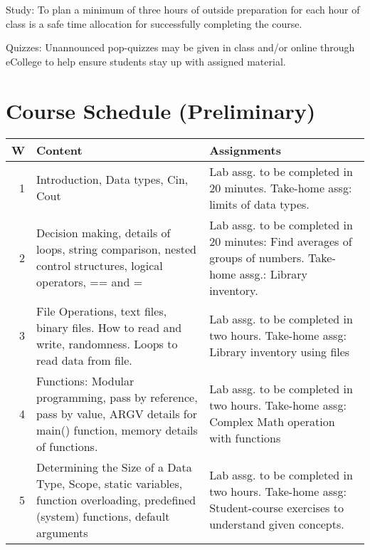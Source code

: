 \documentclass[11pt]{article}
\begin{document}
Study: To plan a minimum of three hours of outside preparation for
each hour of class is a safe time allocation for successfully
completing the course.

Quizzes: Unannounced pop-quizzes may be given in class and/or online
through eCollege to help ensure students stay up with assigned
material.
\section*{Course Schedule (Preliminary)}
\label{sec-11}


\tiny

\begin{center}
\begin{tabular}{rll}
\hline
 \textbf{W}  &  \textbf{Content}                                                                                                                      &  \textbf{Assignments}                                                                                                                                   \\
\hline
\hline
          1  &  Introduction, Data types, Cin, Cout                                                                                                   &  Lab assg. to be completed in 20 minutes. Take-home assg: limits of data types.                                                                         \\
\hline
          2  &  Decision making, details of loops, string comparison, nested control structures, logical operators, == and =                          &  Lab assg. to be completed in 20 minutes: Find averages of groups of numbers. Take-home assg.: Library inventory.                                       \\
\hline
          3  &  File Operations, text files, binary files.  How to read and write, randomness.  Loops to read data from file.                         &  Lab assg. to be completed in two hours. Take-home assg: Library inventory using files                                                                  \\
\hline
          4  &  Functions: Modular programming, pass by reference, pass by value, ARGV details for main() function, memory details of functions.      &  Lab assg. to be completed in two hours. Take-home assg: Complex Math operation with functions                                                          \\
\hline
          5  &  Determining the Size of a Data Type, Scope, static variables, function overloading, predefined (system) functions, default arguments  &  Lab assg. to be completed in two hours. Take-home assg: Student-course exercises to understand given concepts.                                         \\

\end{tabular}
\end{center}
\end{document}
